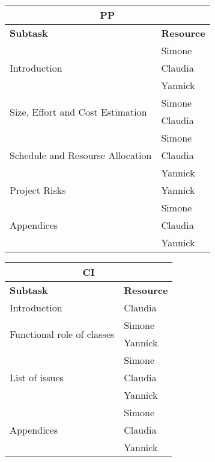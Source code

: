 \vspace* {30px}

\begin{center}
\begin{tabular}{ |l|l| }
	\multicolumn{2}{c}{\textbf{PP}} \\ \hline
	\textbf{Subtask} & \textbf{Resource} \\ \hline
	\multirow{3}{*}{Introduction} & Simone \\ 
				& Claudia \\
				& Yannick \\ \hline
	\multirow{2}{*}{Size, Effort and Cost Estimation} & Simone \\ 
									& Claudia \\ \hline
	\multirow{3}{*}{Schedule and Resourse Allocation} & Simone \\ 
				& Claudia \\
				& Yannick \\ \hline
	\multirow{1}{*}{Project Risks} & Yannick \\ \hline
	\multirow{3}{*}{Appendices} & Simone \\ 
				& Claudia \\
				& Yannick \\ \hline

\end{tabular}
\end{center}


\vspace* {30px}

\begin{center}
\begin{tabular}{ |l|l| }
	\multicolumn{2}{c}{\textbf{CI}} \\ \hline
	\textbf{Subtask} & \textbf{Resource} \\ \hline
	\multirow{1}{*}{Introduction} & Claudia \\ \hline
	\multirow{2}{*}{Functional role of classes} & Simone \\
												& Yannick\\ \hline
	\multirow{3}{*}{List of issues} & Simone\\
									& Claudia\\
									& Yannick \\ \hline
	\multirow{3}{*}{Appendices} & Simone\\
								& Claudia\\
								& Yannick \\ \hline


\end{tabular}
\end{center}